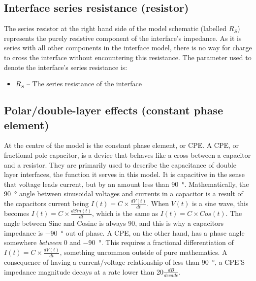   
  \subsection{Interface series resistance (resistor)}
  
  
    The series resistor at the right hand side of the model schematic (labelled $R_{S}$) represents the purely resistive component of the interface's impedance.
    As it is series with all other components in the interface model, there is no way for charge to cross the interface without encountering this resistance.
    The parameter used to denote the interface's series resistance is:
    \begin{itemize}
      \item $R_S$ -- The series resistance of the interface
    \end{itemize}

  \subsection{Polar/double-layer effects (constant phase element)}

    At the centre of the model is the constant phase element, or CPE.
    A CPE, or fractional pole capacitor, is a device that behaves like a cross between a capacitor and a resistor.
    They are primarily used to describe the capacitance of double layer interfaces, the function it serves in this model.
    It is capacitive in the sense that voltage leads current, but by an amount less than \SI{90}{\degree}.
    Mathematically, the \SI{90}{\degree} angle between sinusoidal voltages and currents in a capacitor is a result of the capacitors current being $I(t) = C \times \frac{dV(t)}{dt}$.
    When $V(t)$ is a sine wave, this becomes $I(t) = C \times \frac{d Sin(t)}{dt}$, which is the same as $I(t) = C \times Cos(t)$.
    The angle between Sine and Cosine is always 90, and this is why a capacitors impedance is \SI{-90}{\degree} out of phase.
    A CPE, on the other hand, has a phase angle somewhere \emph{between} 0 and \SI{-90}{\degree}.
    This requires a fractional differentiation of $I(t) = C \times \frac{dV(t)}{dt}$, something uncommon outside of pure mathematics.
    A consequence of having a current/voltage relationship of less than \SI{90}{\degree}, a CPE'S impedance magnitude decays at a rate lower than 20$\frac{dB}{decade}$.

